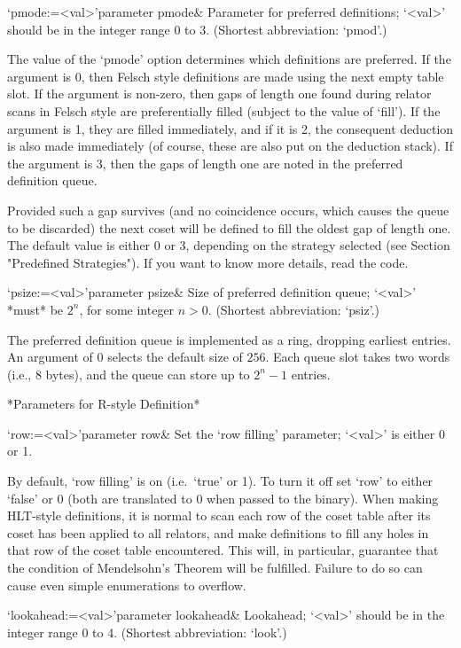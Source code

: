 \>`pmode:=<val>'{parameter pmode}&
Parameter for preferred definitions;  `<val>' should be in the integer
range 0 to 3. (Shortest abbreviation: `pmod'.)

The  value of  the  `pmode' option  determines  which definitions  are
preferred.  If  the argument is  0, then Felsch style  definitions are
made using  the next empty table  slot.  If the  argument is non-zero,
then gaps of length one found during relator scans in Felsch style are
preferentially  filled  (subject to  the  value  of  `fill').  If  the
argument  is 1,  they are  filled  immediately, and  if it  is 2,  the
consequent deduction  is also made  immediately (of course,  these are
also put on the deduction stack).  If the argument is 3, then the gaps
of length one are noted in the preferred definition queue.

Provided such a gap survives  (and no coincidence occurs, which causes
the queue to be discarded) the  next coset will be defined to fill the
oldest  gap of  length  one.  The  default  value is  either  0 or  3,
depending   on  the   strategy  selected   (see   Section  "Predefined
Strategies").  If you want to know more details, read the code.


\>`psize:=<val>'{parameter psize}&
Size of preferred definition queue; `<val>' *must*  be $2^n$, for some
integer $n>0$. (Shortest abbreviation: `psiz'.)

The  preferred definition  queue is  implemented as  a  ring, dropping
earliest entries. An argument of 0 selects  the default size of $256$.
Each  queue slot takes two words (i.e., 8 bytes),  and the  queue  can
store up to $2^n-1$ entries.

*Parameters for R-style Definition*

\>`row:=<val>'{parameter row}&
Set the \lq row filling' parameter; `<val>' is either 0 or 1.

By default, \lq row filling' is on (i.e.~`true' or 1).  To turn it off
set `row' to either `false' or 0 (both are translated to 0 when passed
to the {\ACE} binary).
When making  HLT-style definitions, it is  normal to scan  each row of
the coset table after its coset  has been applied to all relators, and
make definitions  to fill  any holes  in that row  of the  coset table
encountered. This will, in particular, guarantee that the condition of
Mendelsohn's Theorem  will be fulfilled.   Failure to do so  can cause
even simple enumerations to overflow.

\>`lookahead:=<val>'{parameter lookahead}&
Lookahead; `<val>' should be in the integer range 0 to 4.
(Shortest abbreviation: `look'.)
  
